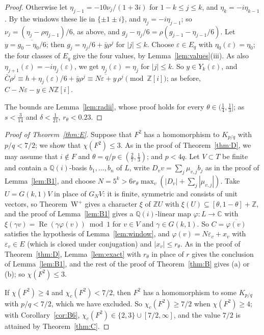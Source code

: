 \documentclass[11pt,a4paper]{amsart}
\theoremstyle{remark}
\newcommand{\Q}{\mathbb{Q}}
\newcommand{\Z}{\mathbb{Z}}
\newcommand{\C}{\mathbb{C}}
\begin{document}
\begin{proof}
Otherwise let $\eta_{j-1}=-10\nu_j/(1+3i)$ for $1-k\le j\le k$, and $\eta_k=-i\eta_{k-1}$. By the windows these lie in
$\{\pm1\pm i\}$, and $\eta_j=-i\eta_{j-1}$; so $\nu_j=(\eta_j-\rho\eta_{j-1})/6$, as above, and
$g_j-\eta_j/6=\rho(g_{j-1}-\eta_{j-1}/6)$. Let $y=\overline{g_0-\eta_0/6}$; then $g_j=\eta_j/6+\bar y\rho^j$ for
$|j|\le k$. Choose $\varepsilon\in E_q$ with $\eta_0(\varepsilon)=\eta_0$; the four classes of $E_q$ give the four
values, by Lemma~\ref{lem:values}(iii). As also $\eta_{j+1}(\varepsilon)=-i\eta_j(\varepsilon)$, we get
$\eta_j(\varepsilon)=\eta_j$ for $|j|\le k$. So $y\in Y_k(\varepsilon)$, and $\bar C\rho^j\equiv
h+\eta_j(\varepsilon)/6+\bar y\rho^j\equiv\overline{N\varepsilon+y}\,\rho^j\pmod{\Z[i]}$; as before,
$C-N\varepsilon-y\in N\Z[i]$.

The bounds are Lemma~\ref{lem:radii}, whose proof holds for every $\theta\in(\frac14,\frac13]$; as $s<\frac3{14}$ and
$\delta<\frac1{21}$, $r_\theta<0.23$.
\end{proof}

\begin{proof}[Proof of Theorem~\ref{thm:E}]
Suppose that $F^2$ has a homomorphism to $K_{p/q}$ with $p/q<7/2$; we show that $\chi(F^2)\le3$. As in the proof of
Theorem~\ref{thm:D}, we may assume that $i\notin F$ and $\theta=q/p\in(\frac27,\frac13)$; and $p<4q$. Let $V\subset T$
be finite and contain a $\Q(i)$-basis $b_1,\dots,b_n$ of $L$, write $D_vv=\sum_j\mu_{v,j}b_j$ as in the proof of
Lemma~\ref{lem:B1}, and choose $N=5^k>6r_\theta\max_v(|D_v|+\sum_j|\mu_{v,j}|)$. Take $U=G(k,1)V$ in place of $G_NV$:
it is finite, symmetric and consists of unit vectors, so Theorem~W$^+$ gives a character $\xi$ of $\Z U$ with
$\xi(U)\subseteq[\theta,1-\theta]+\Z$, and the proof of Lemma~\ref{lem:B1} gives a $\Q(i)$-linear map
$\varphi:L\to\C$ with $\xi(\gamma v)=\operatorname{Re}(\gamma\varphi(v))\bmod1$ for $v\in V$ and $\gamma\in G(k,1)$. So
$C=\overline{\varphi(v)}$ satisfies the hypothesis of Lemma~\ref{lem:window}, and $\varphi(v)=N\varepsilon_v+x_v$ with
$\varepsilon_v\in E$ (which is closed under conjugation) and $|x_v|\le r_\theta$. As in the proof of
Theorem~\ref{thm:D}, Lemma~\ref{lem:exact} with $r_\theta$ in place of $r$ gives the conclusion of
Lemma~\ref{lem:B1}, and the rest of the proof of Theorem~\ref{thm:B} gives (a) or (b); so $\chi(F^2)\le3$.

If $\chi(F^2)\ge4$ and $\chi_c(F^2)<7/2$, then $F^2$ has a homomorphism to some $K_{p/q}$ with $p/q<7/2$, which we
have excluded. So $\chi_c(F^2)\ge7/2$ when $\chi(F^2)\ge4$; with Corollary~\ref{cor:B6}, $\chi_c(F^2)\in\{2,3\}\cup
[7/2,\infty]$, and the value $7/2$ is attained by Theorem~\ref{thm:C}.
\end{proof}
\end{document}
